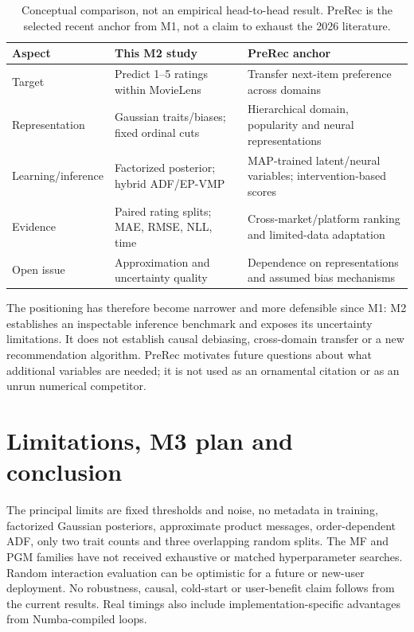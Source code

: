 \documentclass[11pt,a4paper]{article}
\begin{document}
\begin{table}[htbp]\centering\small
\begin{tabularx}{\linewidth}{@{}lXX@{}}\toprule
Aspect & This M2 study & PreRec anchor\\\midrule
Target & Predict 1--5 ratings within MovieLens & Transfer next-item preference across domains\\
Representation & Gaussian traits/biases; fixed ordinal cuts & Hierarchical domain, popularity and neural representations\\
Learning/inference & Factorized posterior; hybrid ADF/EP-VMP & MAP-trained latent/neural variables; intervention-based scores\\
Evidence & Paired rating splits; MAE, RMSE, NLL, time & Cross-market/platform ranking and limited-data adaptation\\
Open issue & Approximation and uncertainty quality & Dependence on representations and assumed bias mechanisms\\\bottomrule
\end{tabularx}
\caption{Conceptual comparison, not an empirical head-to-head result. PreRec is
the selected recent anchor from M1, not a claim to exhaust the 2026 literature.}
\end{table}

The positioning has therefore become narrower and more defensible since M1:
M2 establishes an inspectable inference benchmark and exposes its uncertainty
limitations. It does not establish causal debiasing, cross-domain transfer or a
new recommendation algorithm. PreRec motivates future questions about what
additional variables are needed; it is not used as an ornamental citation or
as an unrun numerical competitor.

\section{Limitations, M3 plan and conclusion}
The principal limits are fixed thresholds and noise, no metadata in training,
factorized Gaussian posteriors, approximate product messages, order-dependent
ADF, only two trait counts and three overlapping random splits. The MF and PGM
families have not received exhaustive or matched hyperparameter searches. Random
interaction evaluation can be optimistic for a future or new-user deployment.
No robustness, causal, cold-start or user-benefit claim follows from the current
results. Real timings also include implementation-specific advantages from
Numba-compiled loops.
\end{document}
